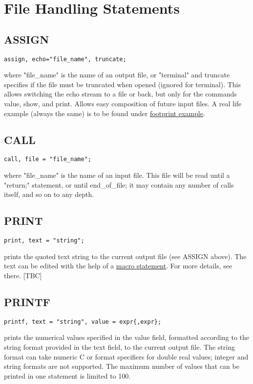 \chapter{File Handling Statements}
\label{chap:files}

\section{ASSIGN}
\label{sec:assign}

\begin{verbatim}
assign, echo="file_name", truncate;
\end{verbatim} 
where "file\_name" is the name of an output file, or "terminal" and
truncate specifies if the file must be truncated when opened (ignored
for terminal). This allows switching the echo stream to a file or back,
but only for the commands value, show, and print. Allows easy
composition of future \madx input files. A real life example (always the
same) is to be found under \href{foot.html}{footprint example}.  

\section{CALL}
\label{sec:call}
\begin{verbatim}
call, file = "file_name";
\end{verbatim} 
where "file\_name"  is the name of an input file. This file will be read
until a "return;" statement, or until end\_of\_file; it may contain any
number of calls itself, and so on to any depth.  



\section{PRINT}
\label{sec:print}
\begin{verbatim}
print, text = "string";
\end{verbatim} 
prints the quoted text string to the current output file (see ASSIGN
above). The text can be edited with the help of a
\href{special.html#macro}{macro statement}. For more details, see
there. [TBC]  


\section{PRINTF}
\label{sec:printf}
\begin{verbatim}
printf, text = "string", value = expr{,expr};
\end{verbatim}
prints the numerical values specified in the value field, formatted
according to the string format provided in the text field, to the
current output file.  
The string format can take numeric C or \madx format specifiers for
double real values; integer and string formats are not supported. 
The maximum number of values that can be printed in one
statement is limited to 100. 

